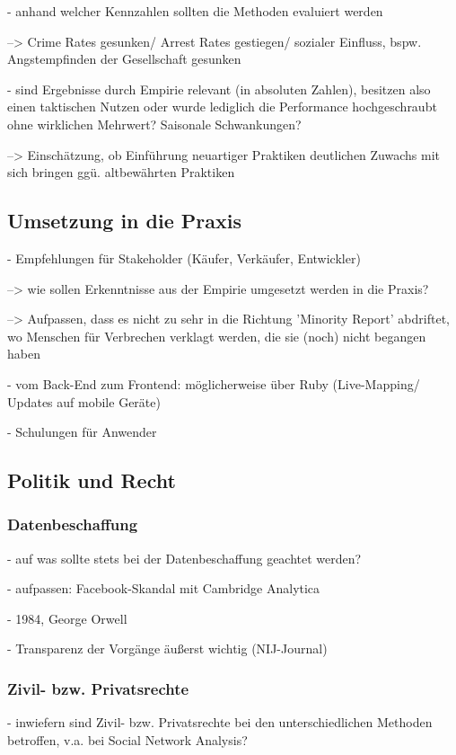 \documentclass[a4paper,12pt,parskip,bibtotoc,liststotoc]{article}
\begin{document}
- anhand welcher Kennzahlen sollten die Methoden evaluiert werden

--> Crime Rates gesunken/ Arrest Rates gestiegen/ sozialer Einfluss, bspw. Angstempfinden der Gesellschaft gesunken

- sind Ergebnisse durch Empirie relevant (in absoluten Zahlen), besitzen also einen taktischen Nutzen oder wurde lediglich die Performance hochgeschraubt ohne wirklichen Mehrwert? Saisonale Schwankungen?

--> Einschätzung, ob Einführung neuartiger Praktiken deutlichen Zuwachs mit sich bringen ggü. altbewährten Praktiken



\subsection{Umsetzung in die Praxis}
- Empfehlungen für Stakeholder (Käufer, Verkäufer, Entwickler) 

--> wie sollen Erkenntnisse aus der Empirie umgesetzt werden in die Praxis? 

--> Aufpassen, dass es nicht zu sehr in die Richtung 'Minority Report' abdriftet, wo Menschen für Verbrechen verklagt werden, die sie (noch) nicht begangen haben

- vom Back-End zum Frontend: möglicherweise über Ruby (Live-Mapping/ Updates auf mobile Geräte)

- Schulungen für Anwender


\subsection{Politik und Recht}

\subsubsection{Datenbeschaffung}

- auf was sollte stets bei der Datenbeschaffung geachtet werden?

- aufpassen: Facebook-Skandal mit Cambridge Analytica

- 1984, George Orwell

- Transparenz der Vorgänge äußerst wichtig (NIJ-Journal)

\subsubsection{Zivil- bzw. Privatsrechte}
- inwiefern sind Zivil- bzw. Privatsrechte bei den unterschiedlichen Methoden betroffen, v.a. bei Social Network Analysis? 
\end{document}
